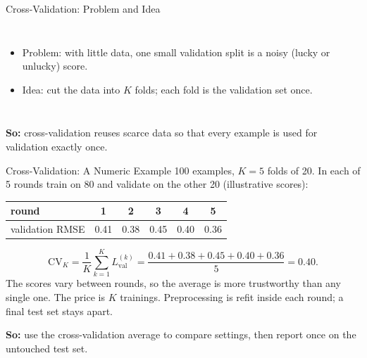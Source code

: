 \documentclass{ntuabeamer}
\newcommand{\takeaway}[1]{\par\vspace{0.3cm}\begingroup\raggedright\noindent
  {\color{courseblue}\textbf{So:}} #1\par\endgroup}
\begin{document}
\begin{frame}{Cross-Validation: Problem and Idea}
  \begin{columns}[c]
    \begin{itemize}
      \item Problem: with little data, one small validation split is a noisy (lucky or unlucky) score.
      \item Idea: cut the data into $K$ folds; each fold is the validation set once.
    \end{itemize}
  \end{columns}
  \takeaway{cross-validation reuses scarce data so that every example is used for validation exactly once.}
\end{frame}

\begin{frame}{Cross-Validation: A Numeric Example}
  100 examples, $K=5$ folds of 20. In each of 5 rounds train on 80 and validate on the other 20
  (illustrative scores):
  \begin{center}
    \begin{tabular}{lccccc}
      \toprule
      round & 1 & 2 & 3 & 4 & 5 \\
      \midrule
      validation RMSE & 0.41 & 0.38 & 0.45 & 0.40 & 0.36 \\
      \bottomrule
    \end{tabular}
  \end{center}
  \[
    \mathrm{CV}_K=\frac1K\sum_{k=1}^{K}L^{(k)}_{\mathrm{val}}=\frac{0.41+0.38+0.45+0.40+0.36}{5}=0.40 .
  \]
  The scores vary between rounds, so the average is more trustworthy than any single one.
  The price is $K$ trainings. Preprocessing is refit inside each round; a final test set stays apart.
  \takeaway{use the cross-validation average to compare settings, then report once on the untouched test set.}
\end{frame}
\end{document}

